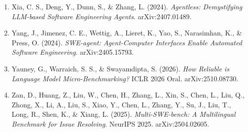 \documentclass[10pt,a4paper]{article}
\begin{document}
\begin{enumerate}
\item
  Xia, C. S., Deng, Y., Dunn, S., \& Zhang, L. (2024). \emph{Agentless: Demystifying LLM-based Software Engineering Agents}. arXiv:2407.01489.
\item
  Yang, J., Jimenez, C. E., Wettig, A., Lieret, K., Yao, S., Narasimhan, K., \& Press, O. (2024). \emph{SWE-agent: Agent-Computer Interfaces Enable Automated Software Engineering}. arXiv:2405.15793.
\item
  Yauney, G., Warraich, S. S., \& Swayamdipta, S. (2026). \emph{How Reliable is Language Model Micro-Benchmarking?} ICLR 2026 Oral. arXiv:2510.08730.
\item
  Zan, D., Huang, Z., Liu, W., Chen, H., Zhang, L., Xin, S., Chen, L., Liu, Q., Zhong, X., Li, A., Liu, S., Xiao, Y., Chen, L., Zhang, Y., Su, J., Liu, T., Long, R., Shen, K., \& Xiang, L. (2025). \emph{Multi-SWE-bench: A Multilingual Benchmark for Issue Resolving}. NeurIPS 2025. arXiv:2504.02605.
\end{enumerate}

\endgroup
\end{document}
